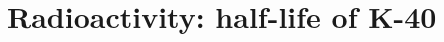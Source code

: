 \documentclass{book}
\begin{document}
 
   
 
  \newcommand\chapterlabel{}\newcommand\ChapterNameLabel{}\newcommand\labname{}\newcommand\chapterpathtocontent{}\newcommand\chapterpathtoimages{}\newcommand\chapterpath{} 

\section{Radioactivity: half-life of K-40}
\renewcommand\chapterlabel{Ch-nuclear}\renewcommand\ChapterNameLabel{\chapterlabel}\renewcommand\labname{nuclear}\renewcommand\chapterpathtocontent{../../}\renewcommand\chapterpathtoimages{\chapterpathtocontent}\renewcommand\chapterpath{../../\chapterlabel/LAB-\labname/}
\end{document}
